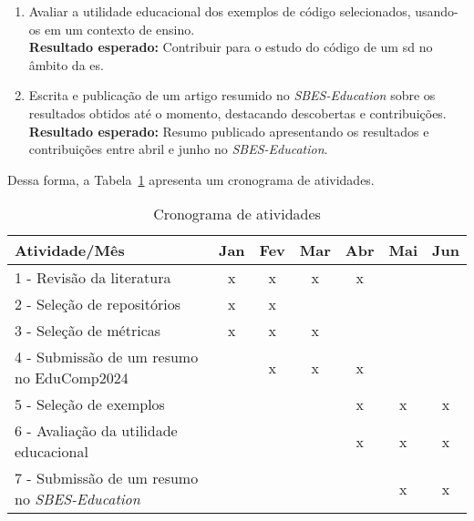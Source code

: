 \begin{enumerate}
    \item Avaliar a utilidade educacional dos exemplos de código selecionados, usando-os em um contexto de ensino.
    \\\textbf{Resultado esperado:} Contribuir para o estudo do código de um \gls{sd} no âmbito da \gls{es}.

    \item Escrita e publicação de um artigo resumido no \textit{SBES-Education} sobre os resultados obtidos até o momento, destacando descobertas e contribuições.
    \\\textbf{Resultado esperado:} Resumo publicado apresentando os resultados e contribuições entre abril e junho no \textit{SBES-Education}.
\end{enumerate}

Dessa forma, a Tabela~\ref{table:schedule} apresenta um cronograma de atividades.

\begin{table}[h]
\centering
\caption{Cronograma de atividades}
\label{table:schedule}
\begin{tabular}{lcccccc}
Atividade/Mês & Jan & Fev & Mar & Abr & Mai & Jun  \\
\hline
1 - Revisão da literatura & x & x & x & x & & \\
2 - Seleção de repositórios & x & x & & & & \\
3 - Seleção de métricas & x & x & x & & & \\
4 - Submissão de um resumo no EduComp2024 & & x & x & x & & \\
5 - Seleção de exemplos & & & & x & x & x \\
6 - Avaliação da utilidade educacional & & & & x & x & x \\
7 - Submissão de um resumo no \textit{SBES-Education} & & & & & x & x
\end{tabular}
\end{table}
